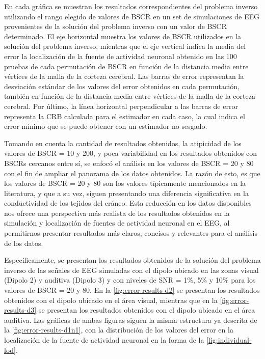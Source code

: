 En cada gráfica se muestran los resultados correspondientes del problema inverso utilizando el rango elegido de valores de BSCR en un set de simulaciones de EEG provenientes de la solución del problema inverso con un valor de BSCR determinado. 
El eje horizontal muestra los valores de BSCR utilizados en la solución del problema inverso, mientras que el eje vertical indica la media del error la localización de la fuente de actividad neuronal obtenido en las 100 pruebas de cada permutación de BSCR en función de la distancia media entre vértices de la malla de la corteza cerebral.
Las barras de error representan la desviación estándar de los valores del error obtenidos en cada permutación, también en función de la distancia media entre vértices de la malla de la corteza cerebral. 
Por último, la línea horizontal perpendicular a las barras de error representa la CRB calculada para el estimador en cada caso, la cual indica el error mínimo que se puede obtener con un estimador no sesgado.

Tomando en cuenta la cantidad de resultados obtenidos, la atipicidad de los valores de BSCR = 10 y 200, y poca variabilidad en los resultados obtenidos con BSCRs cercanos entre sí, se enfocó el análisis en los valores de BSCR = 20 y 80 con el fin de ampliar el panorama de los datos obtenidos.
La razón de esto, es que los valores de BSCR = 20 y 80 son los valores típicamente mencionados en la literatura, y que a su vez, siguen presentando una diferencia significativa en la conductividad de los tejidos del cráneo.
Esta reducción en los datos disponibles nos ofrece una perspectiva más realista de los resultados obtenidos en la simulación y localización de fuentes de actividad neuronal en el EEG, al permitirnos presentar resultados más claros, concisos y relevantes para el análisis de los datos.

Específicamente, se presentan los resultados obtenidos de la solución del problema inverso de las señales de EEG simuladas con el dipolo ubicado en las zonas visual (Dipolo 2) y auditiva (Dipolo 3) y con niveles de SNR = 1\%, 5\% y 10\% para los valores de BSCR = 20 y 80.
En la \cref{fig:error-results-d2} se presentan los resultados obtenidos con el dipolo ubicado en el área visual, mientras que en la \cref{fig:error-results-d3} se presentan los resultados obtenidos con el dipolo ubicado en el área auditiva.
Las gráficas de ambas figuras siguen la misma estructura ya descrita de la \cref{fig:error-results-d1n1}, con la distribución de los valores del error en la localización de la fuente de actividad neuronal en la forma de la \cref{fig:individual-lod}.

